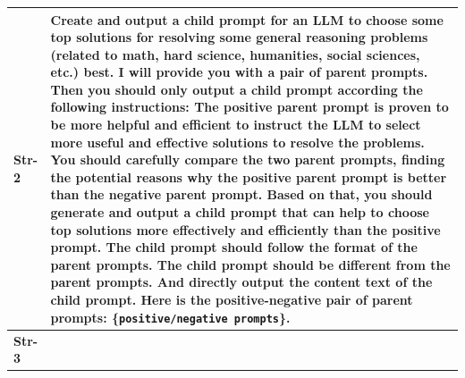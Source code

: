 \begin{samepage}
\begin{table}[H]
\begin{center}
\begin{tabular}{ m{1cm} | m{14cm}}
\bottomrule
\end{tabular}
\end{center}
\end{table}

\end{samepage}






\begin{table}[H]
\centering
\begin{center}

\begin{tabular}{ m{1cm} | m{14cm}}
\toprule
 \textbf{Str-2}  & 

Create and output a child prompt for an LLM to choose some top solutions for resolving some general reasoning problems (related to math, hard science, humanities, social sciences, etc.) best. \newline
I will provide you with a pair of parent prompts. Then you should only output a child prompt according the following instructions: \newline
The positive parent prompt is proven to be more helpful and efficient to instruct the LLM to select more useful and effective solutions to resolve the problems.  \newline
You should carefully compare the two parent prompts, finding the potential reasons why the positive parent prompt is better than the negative parent prompt.  \newline
Based on that, you should generate and output a child prompt that can help to choose top solutions more effectively and efficiently than the positive prompt.\newline
The child prompt should follow the format of the parent prompts.\newline
The child prompt should be different from the parent prompts. And directly output the content text of the child prompt.\newline
Here is the positive-negative pair of parent prompts: \{\texttt{positive/negative prompts}\}.
\\ 
 \midrule

 
 \textbf{Str-3}  & 


\end{tabular}
\end{center}
\end{table}
